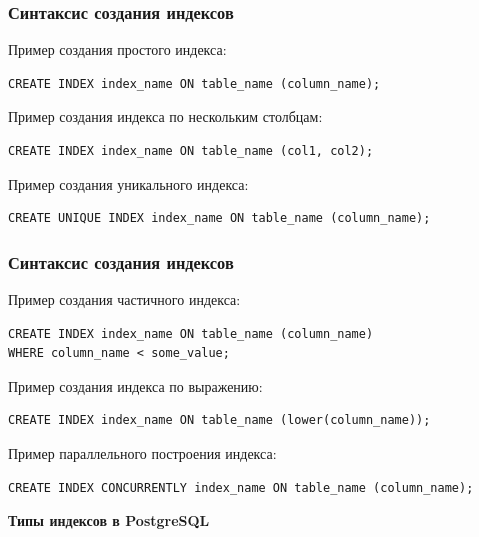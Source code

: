 \documentclass[aspectratio=169]{beamer}
\begin{document}
\begin{frame}[fragile]
  \frametitle{Синтаксис создания индексов}

  Пример создания простого индекса:
  \begin{verbatim}
CREATE INDEX index_name ON table_name (column_name);
  \end{verbatim}

  \vspace*{1em}

  Пример создания индекса по нескольким столбцам:
  \begin{verbatim}
CREATE INDEX index_name ON table_name (col1, col2);
  \end{verbatim}

  \vspace*{1em}

  Пример создания уникального индекса:
  \begin{verbatim}
CREATE UNIQUE INDEX index_name ON table_name (column_name);
  \end{verbatim}
\end{frame}

\begin{frame}[fragile]
  \frametitle{Синтаксис создания индексов}

  Пример создания частичного индекса:
  \begin{verbatim}
CREATE INDEX index_name ON table_name (column_name)
WHERE column_name < some_value;
  \end{verbatim}

  \vspace*{1em}

  Пример создания индекса по выражению:
  \begin{verbatim}
CREATE INDEX index_name ON table_name (lower(column_name));
  \end{verbatim}

  \vspace*{1em}

  Пример параллельного построения индекса:
  \begin{verbatim}
CREATE INDEX CONCURRENTLY index_name ON table_name (column_name);
  \end{verbatim}
\end{frame}

\begin{frame}
  \vspace*{1em}
  \begin{center}
    {\huge \textbf{Типы индексов в PostgreSQL}}
  \end{center}
\end{frame}
\end{document}
